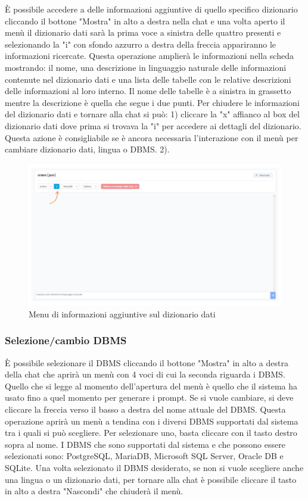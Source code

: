 È possibile accedere a delle informazioni aggiuntive di quello specifico dizionario cliccando il bottone "Mostra" in alto a destra nella chat e una volta aperto il menù il dizionario dati sarà la prima voce a sinistra delle quattro presenti e selezionando la "i" con sfondo azzurro a destra della freccia appariranno le informazioni ricercate. Questa operazione amplierà le informazioni nella scheda mostrando: il nome, una descrizione in linguaggio naturale delle informazioni contenute nel dizionario dati e una lista delle tabelle con le relative descrizioni delle informazioni al loro interno. Il nome delle tabelle è a sinistra in grassetto mentre la descrizione è quella che segue i due punti. Per chiudere le informazioni del dizionario dati e tornare alla chat si può: 1) cliccare la "x" affianco al box del dizionario dati dove prima si trovava la "i" per accedere ai dettagli del dizionario. Questa azione è consigliabile se è ancora necessaria l'interazione con il menù per cambiare dizionario dati, lingua o DBMS. 2).

\begin{figure}[H]
  \centering
  \includegraphics[width=1\textwidth]{assets/info_dizionario.png}
  \caption{Menu di informazioni aggiuntive sul dizionario dati}
\end{figure}

\subsubsection{Selezione/cambio DBMS}

È possibile selezionare il DBMS cliccando il bottone "Mostra" in alto a destra della chat che aprirà un menù con 4 voci di cui la seconda riguarda i DBMS. Quello che si legge al momento dell'apertura del menù è quello che il sistema ha usato fino a quel momento per generare i prompt. Se si vuole cambiare, si deve cliccare la freccia verso il basso a destra del nome attuale del DBMS. Questa operazione aprirà un menù a tendina con i diversi DBMS supportati dal sistema tra i quali si può scegliere. Per selezionare uno, basta cliccare con il tasto destro sopra al nome. I DBMS che sono supportati dal sistema e che possono essere selezionati sono: PostgreSQL, MariaDB, Microsoft SQL Server, Oracle DB e SQLite. Una volta selezionato il DBMS desiderato, se non si vuole scegliere anche una lingua o un dizionario dati, per tornare alla chat è possibile cliccare il tasto in alto a destra "Nascondi" che chiuderà il menù.

